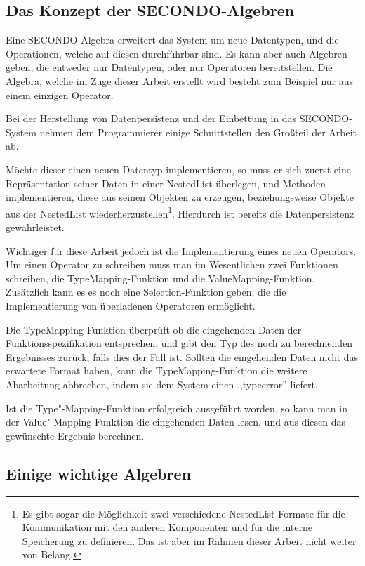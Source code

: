 \subsection{Das Konzept der SECONDO-Algebren}

Eine SECONDO-Algebra erweitert das System um neue Datentypen, und die Operationen, welche auf diesen durchführbar sind. Es kann aber auch Algebren geben, die entweder nur Datentypen, oder nur Operatoren bereitstellen. Die Algebra, welche im Zuge dieser Arbeit erstellt wird besteht zum Beispiel nur aus einem einzigen Operator.

Bei der Herstellung von Datenpersistenz und der Einbettung in das SECONDO-System nehmen dem Programmierer einige Schnittstellen den Großteil der Arbeit ab.

Möchte dieser einen neuen Datentyp implementieren, so muss er sich zuerst eine Repräsentation seiner Daten in einer NestedList überlegen, und Methoden implementieren, diese aus seinen Objekten zu erzeugen, beziehungsweise Objekte aus der NestedList wiederherzustellen\footnote{Es gibt sogar die Möglichkeit zwei  verschiedene NestedList Formate für die Kommunikation mit den anderen Komponenten und für die interne Speicherung zu definieren. Das ist aber im Rahmen dieser Arbeit nicht weiter von Belang.}. Hierdurch ist bereits die Datenpersistenz gewährleistet.

Wichtiger für diese Arbeit jedoch ist die Implementierung eines neuen Operators. Um einen Operator zu schreiben muss man im Wesentlichen zwei Funktionen schreiben, die TypeMapping-Funktion und die ValueMapping-Funktion. Zusätzlich kann es es noch eine Selection-Funktion geben, die die Implementierung von überladenen Operatoren ermöglicht.

Die TypeMapping-Funktion überprüft ob die eingehenden Daten der Funktionsspezifikation entsprechen, und gibt den Typ des noch zu berechnenden Ergebnisses zurück, falls dies der Fall ist. Sollten die eingehenden Daten nicht das erwartete Format haben, kann die TypeMapping-Funktion die weitere Abarbeitung abbrechen, indem sie dem System einen ,,typeerror'' liefert.

Ist die Type"-Mapping-Funktion erfolgreich ausgeführt worden, so kann man in der Value"-Mapping-Funktion die eingehenden Daten lesen, und aus diesen das gewünschte Ergebnis berechnen.


\subsection{Einige wichtige Algebren}

